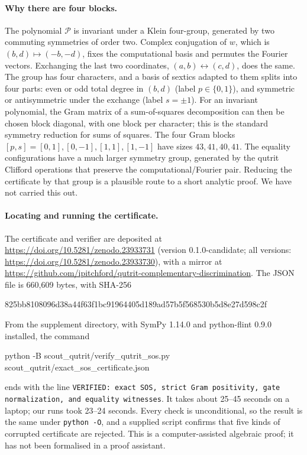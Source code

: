 \documentclass[11pt,a4paper]{article}
\numberwithin{equation}{section}
\theoremstyle{remark}\newtheorem{remark}[theorem]{Remark}
\begin{document}
\paragraph{Why there are four blocks.}
The polynomial $\mathcal P$ is invariant under a Klein four-group, generated by two commuting symmetries of order two. Complex conjugation of $w$, which is $(b,d)\mapsto(-b,-d)$, fixes the computational basis and permutes the Fourier vectors. Exchanging the last two coordinates, $(a,b)\leftrightarrow(c,d)$, does the same. The group has four characters, and a basis of sextics adapted to them splits into four parts: even or odd total degree in $(b,d)$ (label $p\in\{0,1\}$), and symmetric or antisymmetric under the exchange (label $s=\pm1$). For an invariant polynomial, the Gram matrix of a sum-of-squares decomposition can then be chosen block diagonal, with one block per character; this is the standard symmetry reduction for sums of squares. The four Gram blocks $[p,s]=[0,1],[0,-1],[1,1],[1,-1]$ have sizes $43,41,40,41$. The equality configurations have a much larger symmetry group, generated by the qutrit Clifford operations that preserve the computational/Fourier pair. Reducing the certificate by that group is a plausible route to a short analytic proof. We have not carried this out.

\paragraph{Locating and running the certificate.}
The certificate and verifier are deposited at \url{https://doi.org/10.5281/zenodo.23933731} (version 0.1.0-candidate; all versions: \url{https://doi.org/10.5281/zenodo.23933730}), with a mirror at \url{https://github.com/ipitchford/qutrit-complementary-discrimination}. The JSON file is 660,609 bytes, with SHA-256
\begin{center}\small\ttfamily
825bb8108096d38a44f63f1bc91964405d189ad57b5f568530b5d8e27d598c2f
\end{center}
From the supplement directory, with SymPy 1.14.0 and python-flint 0.9.0 installed, the command
\begin{center}\small\ttfamily
python -B scout\_qutrit/verify\_qutrit\_sos.py scout\_qutrit/exact\_sos\_certificate.json
\end{center}
ends with the line \texttt{VERIFIED: exact SOS, strict Gram positivity, gate normalization, and equality witnesses}. It takes about 25--45 seconds on a laptop; our runs took 23--24 seconds. Every check is unconditional, so the result is the same under \texttt{python -O}, and a supplied script confirms that five kinds of corrupted certificate are rejected. This is a computer-assisted algebraic proof; it has not been formalised in a proof assistant.
\end{document}
